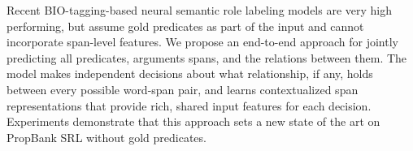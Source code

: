 Recent BIO-tagging-based neural semantic role labeling models are very high performing, but assume gold predicates as part of the input and cannot incorporate span-level features. We propose an end-to-end approach for jointly predicting all predicates, arguments spans, and the relations between them. The model makes independent decisions about what relationship, if any, holds between every possible word-span pair, and learns contextualized span representations that provide rich, shared input features for each decision. Experiments demonstrate that this approach sets a new state of the art on PropBank SRL without gold predicates.
